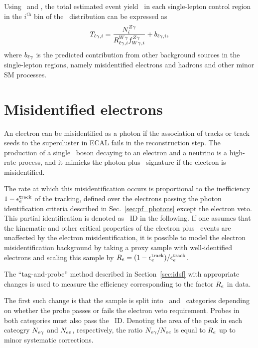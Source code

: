 Using \RWl\ and \fZW, the total estimated event yield \Tl\ in each single-lepton control region in the $i^\mathrm{th}$ bin of the \ETg\ distribution can be expressed as
\begin{equation}
  \Tl[,i] = \frac{\NZg[i]}{\RWl[,i]\fZW[,i]} + b_{\ell\Pgg,i},
\end{equation}
where $b_{\ell\Pgg}$ is the predicted contribution from other background sources in the single-lepton regions, namely misidentified electrons and hadrons and other minor SM processes.

\section{Misidentified electrons}
\label{sec:efake}

An electron can be misidentified as a photon if the association of tracks or track seeds to the supercluster in ECAL fails in the reconstruction step. 
The production of a single \PW\ boson decaying to an electron and a neutrino is a high-rate process, and it mimicks the photon plus \met\ signature if the electron is misidentified.

The rate at which this misidentification occurs is proportional to the inefficiency $1 - \epsilon_{\Pe}^{\text{track}}$ of the tracking, defined over the electrons passing the photon identification criteria described in Sec.~\ref{sec:pf_photons} except the electron veto. 
This partial identification is denoted as \Pe\Pgg\ ID in the following.  
If one assumes that the kinematic and other critical properties of the electron plus \met\ events are unaffected by the electron misidentification, it is possible to model the electron misidentification background by taking a proxy sample with well-identified electrons and scaling this sample by $R_{\Pe} = (1 - \epsilon_{\Pe}^{\text{track}}) / \epsilon_{\Pe}^{\text{track}}$.

The ``tag-and-probe'' method described in Section~\ref{sec:idsf} with appropriate changes is used to measure the efficiency corresponding to the factor $R_{\Pe}$ in data.

The first such change is that the sample is split into \Pe\Pgg\ and \Pe\Pe\ categories depending on whether the probe passes or fails the electron veto requirement. 
Probes in both categories must also pass the \Pe\Pgg\ ID.
Denoting the area of the peak in each cateogry  $N_{\Pe\Pgg}$ and $N_{\Pe\Pe}$, respectively, the ratio $N_{\Pe\Pgg} / N_{\Pe\Pe}$ is equal to $R_{\Pe}$ up to minor systematic corrections.

